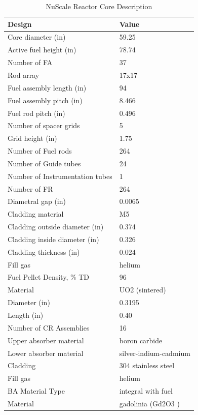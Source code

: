 \documentclass[10pt,a4paper]{article}
\begin{document}
\begin{table} [htbp]
\begin{center}

\caption{NuScale Reactor Core Description \cite{NuChapter4}}
\label{Nutable}
\begin{tabular}{l     l}
\hline 
Design 		&Value \\ 
\hline 
Core diameter (in)			&59.25\\
Active fuel height (in)	&78.74\\

Number of FA 		&  37\\
Rod array   			&17x17\\
Fuel assembly length (in) &  94\\
Fuel assembly pitch (in)	&8.466\\
Fuel rod pitch (in)&0.496\\
Number of spacer grids&5\\
Grid height (in)&1.75\\
Number of Fuel rods&264\\
Number of Guide tubes&24\\
Number of Instrumentation tubes&1\\
\hline 
Number of FR&264\\
Diametral gap (in)&0.0065\\
Cladding material&M5\\
Cladding outside diameter (in)&0.374\\
Cladding inside diameter (in)&0.326\\
Cladding thickness (in)&0.024\\
Fill gas&helium\\
\hline 
Fuel Pellet Density, \% TD&96\\
Material&UO2 (sintered)\\
Diameter (in)&0.3195\\
Length (in) &0.40\\
\hline 
Number of CR Assemblies&16                              \\
Upper absorber material&boron carbide              \\
Lower absorber material&silver-indium-cadmium \\
Cladding&304 stainless steel      \\
Fill gas&helium                        \\
\hline 
BA Material Type&integral with fuel         \\
Material &gadolinia (Gd2O3 )      \\

\end{tabular}
\end{center}
\end{table}
\end{document}
